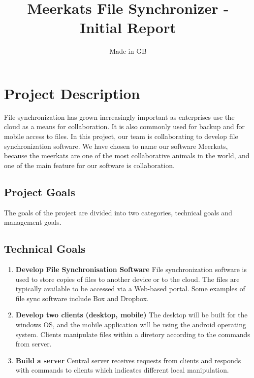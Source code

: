 \documentclass{article}
\title{Meerkats File Synchronizer - Initial Report}
\author{Made in GB}
\date{}
\begin{document}
\maketitle{}


\section{Project Description}

File synchronization has grown increasingly important as enterprises use the cloud as a means for collaboration. It is also commonly used for backup and for mobile access to files. In this project, our team is collaborating to develop file synchronization software. We have chosen to name our software Meerkats, because the meerkats are one of the most collaborative animals in the world, and one of the main feature for our software is collaboration.

\subsection{Project Goals}
The goals of the project are divided into two categories, technical goals and management goals.

\subsection{Technical Goals}

\begin{enumerate}
  \item \textbf{Develop File Synchronisation Software} File synchronization software is used to store copies of files to another device or to the cloud. The files are typically available to be accessed via a Web-based portal. Some examples of file sync software include Box and Dropbox.
  \item \textbf{Develop two clients (desktop, mobile)} The desktop will be built for the windows OS, and the mobile application will be using the android operating system. Clients manipulate files within a diretory according to the commands from server.
  \item \textbf{Build a server} Central server receives requests from clients and responds with commands to clients which indicates different local manipulation.

\end{enumerate}
\end{document}
